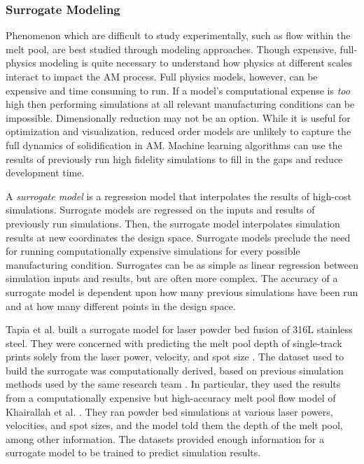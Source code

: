 

\subsubsection{Surrogate Modeling}
Phenomenon which are difficult to study experimentally, such as flow within the melt pool, are best studied through modeling approaches. Though expensive, full-physics modeling is quite necessary to understand how physics at different scales interact to impact the AM process. Full physics models, however, can be expensive and time consuming to run.  If a model's computational expense is \textit{too} high then performing simulations at all relevant manufacturing conditions can be impossible. Dimensionally reduction may not be an option. While it is useful for optimization and visualization, reduced order models are unlikely to capture the full dynamics of solidification in AM. Machine learning algorithms can use the results of previously run high fidelity simulations to fill in the gaps and reduce development time.

A \textit{surrogate model} is a regression model that interpolates the results of high-cost simulations. Surrogate models are regressed on the inputs and results of previously run simulations. Then, the surrogate model interpolates simulation results at new coordinates the design space. Surrogate models preclude the need for running computationally expensive simulations for every possible manufacturing condition. Surrogates can be as simple as linear regression between simulation inputs and results, but are often more complex. The accuracy of a surrogate model is dependent upon how many previous simulations have been run and at how many different points in the design space.

Tapia et al. built a surrogate model for laser powder bed fusion of 316L stainless steel. They were concerned with predicting the melt pool depth of single-track prints solely from the laser power, velocity, and spot size \cite{Tapia2017}. The dataset used to build the surrogate was computationally derived, based on previous simulation methods used by the same research team \cite{King2014}. In particular, they used the results from a computationally expensive but high-accuracy melt pool flow model of Khairallah et al. \cite{Khairallah2016}. They ran powder bed simulations at various laser powers, velocities, and spot sizes, and the model told them the depth of the melt pool, among other information. The datasets provided enough information for a surrogate model to be trained to predict simulation results.

